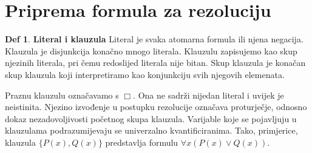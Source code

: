 \documentclass{article}
\theoremstyle{definition}
\newtheorem{definicija}{Def}[section]
\theoremstyle{plain}
\begin{document}
\section{Priprema formula za rezoluciju}
\begin{definicija}\textbf{Literal i klauzula}\newline
Literal je svaka atomarna formula ili njena negacija. Klauzula je disjunkcija konačno mnogo literala. Klauzulu zapisujemo kao skup njezinih literala, pri čemu redoslijed literala nije bitan. Skup klauzula je konačan skup klauzula koji interpretiramo kao konjunkciju svih njegovih elemenata.
\end{definicija}
Praznu klauzulu označavamo s $\Box$. Ona ne sadrži nijedan literal i uvijek je neistinita. Njezino izvođenje u postupku rezolucije označava proturječje, odnosno dokaz nezadovoljivosti početnog skupa klauzula. Varijable koje se pojavljuju u klauzulama podrazumijevaju se univerzalno kvantificiranima. Tako, primjerice, klauzula $\{P(x),Q(x)\}$ predstavlja formulu $\forall x(P(x)\lor Q(x))$.
\end{document}
